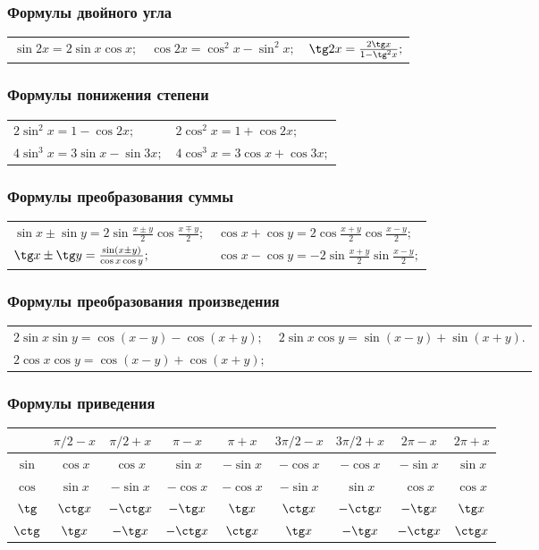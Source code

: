 \subsubsection{Формулы двойного угла}
\begin{longtable}[l]{l l l}
$\sin 2x = 2\sin x \cos x;$
&
$\cos 2x = \cos^2 x - \sin^2 x;$
&
$\tg 2x = \frac{2\tg x}{1-\tg^2x};$
\end{longtable}

\subsubsection{Формулы понижения степени}
\begin{longtable}[l]{ l l }
$2\sin^2x=1-\cos 2x;$
&
$2\cos^2x=1+\cos 2x;$
\\
$4\sin^3x=3\sin x-\sin 3x;$
&
$4\cos^3x=3\cos x+\cos 3x;$
\end{longtable}

\subsubsection{Формулы преобразования суммы}
\begin{longtable}[l]{ l l}
$\sin x\pm \sin y =2 \sin \frac{x\pm y}{2} \cos \frac{x\mp y}{2};$
&
$\cos x + \cos y  = 2 \cos \frac{x + y}{2} \cos \frac{x - y}{2};$
\\
$\tg x \pm \tg y = \frac{\sin (x \pm y)}{ \cos x \cos y};$
&
$\cos x - \cos y  = -2 \sin \frac{x + y}{2} \sin\frac{x - y}{2};$
\end{longtable}

\subsubsection{Формулы преобразования произведения}
\begin{longtable}[l]{l l}
$2\sin x \sin y = \cos (x-y)-\cos(x+y);$
&
$2\sin x \cos y = \sin (x-y)+\sin(x+y).$
\\
$2\cos x \cos y = \cos (x-y)+\cos(x+y);$
\end{longtable}

\subsubsection{Формулы приведения}
\tiny
\begin{longtable}{|c|c|c|c|c|c|c|c|c|}
\hline
&
$\pi/2-x$
&
$\pi/2+x$
&
$\pi-x$
&
$\pi+x$
&
$3\pi/2-x$
&
$3\pi/2+x$
&
$2\pi-x$
&
$2\pi+x$
\\\hline
$\sin$
&
$\cos x$
&
$\cos x$
&
$\sin x$
&
$-\sin x$
&
$-\cos x$
&
$-\cos x$
&
$-\sin x$
&
$\sin x$
\\\hline
$\cos$
&
$\sin x$
&
$-\sin x$
&
$-\cos x$
&
$-\cos x$
&
$-\sin x$
&
$\sin x$
&
$\cos x$
&
$\cos x$
\\\hline
$\tg$
&
$\ctg x$
&
$-\ctg x$
&
$-\tg x$
&
$\tg x$
&
$\ctg x$
&
$-\ctg x$
&
$-\tg x$
&
$\tg x$
\\\hline
$\ctg$
&
$\tg x$
&
$-\tg x$
&
$-\ctg x$
&
$\ctg x$
&
$\tg x$
&
$-\tg x$
&
$-\ctg x$
&
$\ctg x$
\\\hline
\end{longtable}

